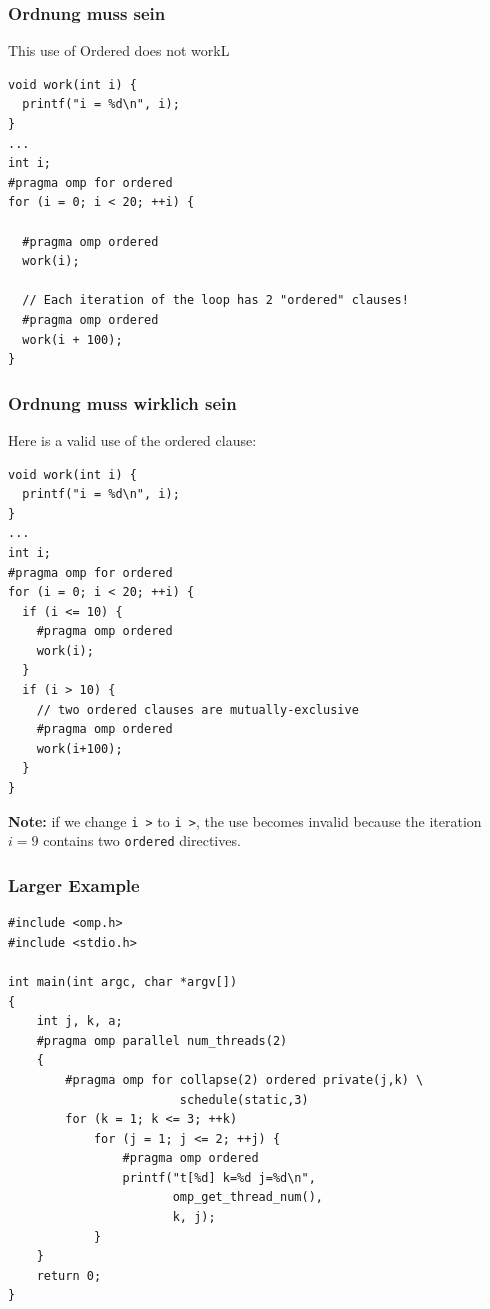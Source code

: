 \begin{frame}[fragile]
\frametitle{Ordnung muss sein}

This use of Ordered does not workL

  \begin{lstlisting}
void work(int i) {
  printf("i = %d\n", i);
}
...
int i;
#pragma omp for ordered
for (i = 0; i < 20; ++i) {

  #pragma omp ordered
  work(i);

  // Each iteration of the loop has 2 "ordered" clauses!
  #pragma omp ordered 
  work(i + 100);
}
\end{lstlisting}


\end{frame}


\begin{frame}[fragile]
\frametitle{Ordnung muss wirklich sein}

Here is a valid use of the ordered clause:
 \begin{lstlisting}
void work(int i) {
  printf("i = %d\n", i);
}
...
int i;
#pragma omp for ordered
for (i = 0; i < 20; ++i) {
  if (i <= 10) {
    #pragma omp ordered
    work(i);
  }
  if (i > 10) {
    // two ordered clauses are mutually-exclusive
    #pragma omp ordered
    work(i+100);
  }
}
  \end{lstlisting}

{\bf Note:} if we change {\tt i \textgreater{}} to {\tt i \textgreater{}}, 
the use becomes invalid because the iteration $i=9$ contains two {\tt ordered}
directives.

\end{frame}


\begin{frame}[fragile]
\frametitle{Larger Example}

  \begin{lstlisting}
#include <omp.h>
#include <stdio.h>

int main(int argc, char *argv[])
{
    int j, k, a;
    #pragma omp parallel num_threads(2)
    {
        #pragma omp for collapse(2) ordered private(j,k) \
                        schedule(static,3)
        for (k = 1; k <= 3; ++k)
            for (j = 1; j <= 2; ++j) {
                #pragma omp ordered
                printf("t[%d] k=%d j=%d\n",
                       omp_get_thread_num(),
                       k, j);
            }
    }
    return 0;
}
  \end{lstlisting}

\end{frame}

